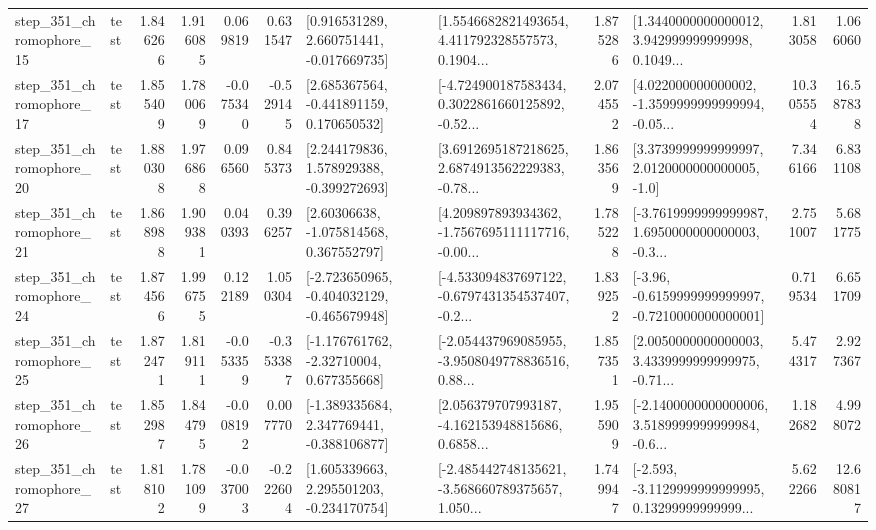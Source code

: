 \begin{tabular}{llrrrrllrlrr}
  step\_351\_chromophore\_15 &      test &      1.846266 &    1.916085 &      0.069819 &  0.631547 &    [0.916531289, 2.660751441, -0.017669735] &  [1.5546682821493654, 4.411792328557573, 0.1904... &       1.875286 &  [1.3440000000000012, 3.942999999999998, 0.1049... &            1.813058 &          1.066060 \\
  step\_351\_chromophore\_17 &      test &      1.855409 &    1.780069 &     -0.075340 & -0.529145 &    [2.685367564, -0.441891159, 0.170650532] &  [-4.724900187583434, 0.3022861660125892, -0.52... &       2.074552 &  [4.022000000000002, -1.3599999999999994, -0.05... &           10.305554 &         16.587838 \\
  step\_351\_chromophore\_20 &      test &      1.880308 &    1.976868 &      0.096560 &  0.845373 &    [2.244179836, 1.578929388, -0.399272693] &  [3.6912695187218625, 2.6874913562229383, -0.78... &       1.863569 &     [3.3739999999999997, 2.0120000000000005, -1.0] &            7.346166 &          6.831108 \\
  step\_351\_chromophore\_21 &      test &      1.868988 &    1.909381 &      0.040393 &  0.396257 &     [2.60306638, -1.075814568, 0.367552797] &  [4.209897893934362, -1.7567695111117716, -0.00... &       1.785228 &  [-3.7619999999999987, 1.6950000000000003, -0.3... &            2.751007 &          5.681775 \\
  step\_351\_chromophore\_24 &      test &      1.874566 &    1.996755 &      0.122189 &  1.050304 &  [-2.723650965, -0.404032129, -0.465679948] &  [-4.533094837697122, -0.6797431354537407, -0.2... &       1.839252 &  [-3.96, -0.6159999999999997, -0.7210000000000001] &            0.719534 &          6.651709 \\
  step\_351\_chromophore\_25 &      test &      1.872471 &    1.819111 &     -0.053359 & -0.353387 &    [-1.176761762, -2.32710004, 0.677355668] &  [-2.054437969085955, -3.9508049778836516, 0.88... &       1.857351 &  [2.0050000000000003, 3.4339999999999975, -0.71... &            5.474317 &          2.927367 \\
  step\_351\_chromophore\_26 &      test &      1.852987 &    1.844795 &     -0.008192 &  0.007770 &   [-1.389335684, 2.347769441, -0.388106877] &  [2.056379707993187, -4.162153948815686, 0.6858... &       1.955909 &  [-2.1400000000000006, 3.5189999999999984, -0.6... &            1.182682 &          4.998072 \\
  step\_351\_chromophore\_27 &      test &      1.818102 &    1.781099 &     -0.037003 & -0.222604 &    [1.605339663, 2.295501203, -0.234170754] &  [-2.485442748135621, -3.568660789375657, 1.050... &       1.749947 &  [-2.593, -3.1129999999999995, 0.13299999999999... &            5.622266 &         12.680817 \\

\end{tabular}
